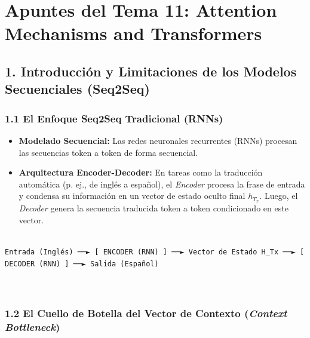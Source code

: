 \documentclass[11pt,oneside]{article}
\begin{document}
\tableofcontents
\clearpage
{}
\section{Apuntes del Tema 11: Attention Mechanisms and Transformers}

\subsection{1. Introducción y Limitaciones de los Modelos Secuenciales (Seq2Seq)}

\subsubsection{1.1 El Enfoque Seq2Seq Tradicional (RNNs)}

\begin{itemize}

\item \textbf{Modelado Secuencial:} Las redes neuronales recurrentes (RNNs) procesan las secuencias token a token de forma secuencial.

\end{itemize}

\begin{itemize}

\item \textbf{Arquitectura Encoder-Decoder:} En tareas como la traducción automática (p. ej., de inglés a español), el \emph{Encoder} procesa la frase de entrada y condensa su información en un vector de estado oculto final \(h_{T_x}\). Luego, el \emph{Decoder} genera la secuencia traducida token a token condicionado en este vector.

\end{itemize}

\begin{lstlisting}

Entrada (Inglés) ──► [ ENCODER (RNN) ] ──► Vector de Estado H_Tx ──► [ DECODER (RNN) ] ──► Salida (Español)



\end{lstlisting}

\subsubsection{1.2 El Cuello de Botella del Vector de Contexto (\emph{Context Bottleneck})}
\end{document}
